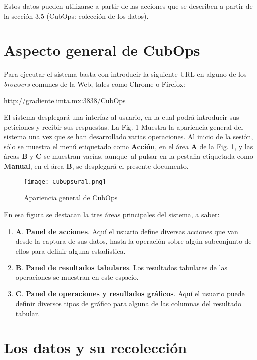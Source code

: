 \documentclass[spanish,]{article}
\providecommand{\tightlist}{%
  \setlength{\itemsep}{0pt}\setlength{\parskip}{0pt}}
\begin{document}
Estos datos pueden utilizarse a partir de las acciones que se describen
a partir de la sección 3.5 (CubOps: colección de los datos).

\section{Aspecto general de CubOps}\label{aspecto-general-de-cubops}

Para ejecutar el sistema basta con introducir la siguiente URL en alguno
de los \emph{browsers} comunes de la Web, tales como Chrome o Firefox:

\url{http://gradiente.imta.mx:3838/CubOps}

El sistema desplegará una interfaz al usuario, en la cual podrá
introducir sus peticiones y recibir sus respuestas. La Fig. 1 Muestra la
apariencia general del sistema una vez que se han desarrollado varias
operaciones. Al inicio de la sesión, sólo se muestra el menú etiquetado
como \textbf{Acción}, en el área \textbf{A} de la Fig. 1, y las áreas
\textbf{B} y \textbf{C} se muestran vacías, aunque, al pulsar en la
pestaña etiquetada como \textbf{Manual}, en el área \textbf{B}, se
desplegará el presente documento.

\begin{figure}
\centering
\texttt{[image: CubOpsGral.png]}
\caption{Apariencia general de CubOps}
\end{figure}

En esa figura se destacan la tres áreas principales del sistema, a
saber:

\begin{enumerate}
\def\labelenumi{\arabic{enumi}.}
\tightlist
\item
  \textbf{A}. \textbf{Panel de acciones}. Aquí el usuario define
  diversas acciones que van desde la captura de sus datos, hasta la
  operación sobre algún subconjunto de ellos para definir alguna
  estadística.
\item
  \textbf{B}. \textbf{Panel de resultados tabulares}. Los resultados
  tabulares de las operaciones se muestran en este espacio.
\item
  \textbf{C}. \textbf{Panel de operaciones y resultados gráficos}. Aquí
  el usuario puede definir diversos tipos de gráfico para alguna de las
  columnas del resultado tabular.
\end{enumerate}

\section{Los datos y su recolección}\label{los-datos-y-su-recoleccion}
\end{document}
